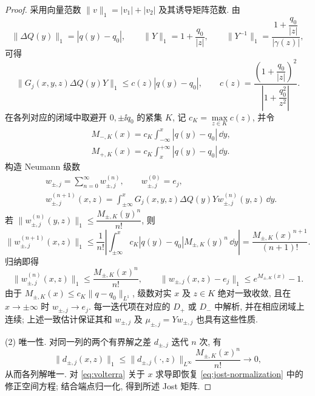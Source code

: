 \begin{proof}
采用向量范数 $\|v\|_1=|v_1|+|v_2|$ 及其诱导矩阵范数. 由
\begin{equation*}
\|\Delta Q(y)\|_1=|q(y)-q_0|,\qquad
\|Y\|_1=1+\dfrac{q_0}{|z|},\qquad
\|Y^{-1}\|_1=\dfrac{1+\dfrac{q_0}{|z|}}{|\gamma(z)|},
\end{equation*}
可得
\begin{equation}\label{eq:jost-kernel-estimate}
\|G_j(x,y,z)\Delta Q(y)Y\|_1
\le c(z)|q(y)-q_0|,\qquad
c(z)=\dfrac{\left(1+\dfrac{q_0}{|z|}\right)^2}{\left|1+\dfrac{q_0^2}{z^2}\right|}.
\end{equation}
在各列对应的闭域中取避开 $0,\pm\ii q_0$ 的紧集 $K$, 记 $c_K=\max\limits_{z\in K}c(z)$, 并令
\begin{equation*}
\begin{aligned}
&M_{-,K}(x)=c_K\int_{-\infty}^{x}|q(y)-q_0|\,\dd y,\\
&M_{+,K}(x)=c_K\int_x^{+\infty}|q(y)-q_0|\,\dd y.
\end{aligned}
\end{equation*}
构造 Neumann 级数
\begin{equation}\label{eq:jost-neumann}
\begin{aligned}
&w_{\pm,j}=\sum\limits_{n=0}^{\infty}w_{\pm,j}^{(n)},\qquad w_{\pm,j}^{(0)}=e_j,\\
&w_{\pm,j}^{(n+1)}(x,z)=\int_{\pm\infty}^{x}
G_j(x,y,z)\Delta Q(y)Yw_{\pm,j}^{(n)}(y,z)\,\dd y.
\end{aligned}
\end{equation}
若 $\|w_{\pm,j}^{(n)}(y,z)\|_1\le \dfrac{M_{\pm,K}(y)^n}{n!}$, 则
\begin{equation*}
\|w_{\pm,j}^{(n+1)}(x,z)\|_1
\le\dfrac{1}{n!}\left|\int_{\pm\infty}^{x}c_K|q(y)-q_0|M_{\pm,K}(y)^n\,\dd y\right|
=\dfrac{M_{\pm,K}(x)^{n+1}}{(n+1)!}.
\end{equation*}
归纳即得
\begin{equation}\label{eq:jost-factorial}
\|w_{\pm,j}^{(n)}(x,z)\|_1\le\dfrac{M_{\pm,K}(x)^n}{n!},\qquad
\|w_{\pm,j}(x,z)-e_j\|_1\le e^{M_{\pm,K}(x)}-1.
\end{equation}
由于 $M_{\pm,K}(x)\le c_K\|q-q_0\|_{L^1}$, 级数对实 $x$ 及 $z\in K$ 绝对一致收敛,
且在 $x\to\pm\infty$ 时 $w_{\pm,j}\to e_j$.
每一迭代项在对应的 $D_+$ 或 $D_-$ 中解析, 并在相应闭域上连续;
上述一致估计保证其和 $w_{\pm,j}$ 及 $\mu_{\pm,j}=Yw_{\pm,j}$ 也具有这些性质.

(2) 唯一性. 对同一列的两个有界解之差 $d_{\pm,j}$ 迭代 $n$ 次, 有
\begin{equation*}
\|d_{\pm,j}(x,z)\|_1\le\|d_{\pm,j}(\cdot,z)\|_{L^\infty}
\dfrac{M_{\pm,K}(x)^n}{n!}\longrightarrow0,
\end{equation*}
从而各列解唯一.
对 \eqref{eq:volterra} 关于 $x$ 求导即恢复 \eqref{eq:jost-normalization} 中的修正空间方程;
结合端点归一化, 得到所述 Jost 矩阵.
\end{proof}

